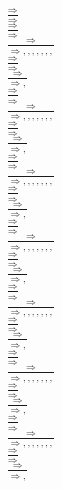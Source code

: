 \documentclass[11pt]{article}
\begin{document}
\begin{center}
\bigskip
\\$\frac{\Rightarrow }{\Rightarrow }$
\bigskip
\\$\frac{\Rightarrow }{\Rightarrow }$
\bigskip
\\$\frac{\Rightarrow }{\Rightarrow , , , , , , , }$
\bigskip
\\$\frac{\Rightarrow }{\Rightarrow }$
\bigskip
\\$\frac{\Rightarrow }{\Rightarrow , }$
\bigskip
\\$\frac{\Rightarrow }{\Rightarrow }$
\bigskip
\\$\frac{\Rightarrow }{\Rightarrow , , , , , , , }$
\bigskip
\\$\frac{\Rightarrow }{\Rightarrow }$
\bigskip
\\$\frac{\Rightarrow }{\Rightarrow , }$
\bigskip
\\$\frac{\Rightarrow }{\Rightarrow }$
\bigskip
\\$\frac{\Rightarrow }{\Rightarrow , , , , , , , }$
\bigskip
\\$\frac{\Rightarrow }{\Rightarrow }$
\bigskip
\\$\frac{\Rightarrow }{\Rightarrow , }$
\bigskip
\\$\frac{\Rightarrow }{\Rightarrow }$
\bigskip
\\$\frac{\Rightarrow }{\Rightarrow , , , , , , , }$
\bigskip
\\$\frac{\Rightarrow }{\Rightarrow }$
\bigskip
\\$\frac{\Rightarrow }{\Rightarrow , }$
\bigskip
\\$\frac{\Rightarrow }{\Rightarrow }$
\bigskip
\\$\frac{\Rightarrow }{\Rightarrow , , , , , , , }$
\bigskip
\\$\frac{\Rightarrow }{\Rightarrow }$
\bigskip
\\$\frac{\Rightarrow }{\Rightarrow , }$
\bigskip
\\$\frac{\Rightarrow }{\Rightarrow }$
\bigskip
\\$\frac{\Rightarrow }{\Rightarrow , , , , , , , }$
\bigskip
\\$\frac{\Rightarrow }{\Rightarrow }$
\bigskip
\\$\frac{\Rightarrow }{\Rightarrow , }$
\bigskip
\\$\frac{\Rightarrow }{\Rightarrow }$
\bigskip
\\$\frac{\Rightarrow }{\Rightarrow , , , , , , , }$
\bigskip
\\$\frac{\Rightarrow }{\Rightarrow }$
\bigskip
\\$\frac{\Rightarrow }{\Rightarrow , }$

\end{center}
\end{document}
